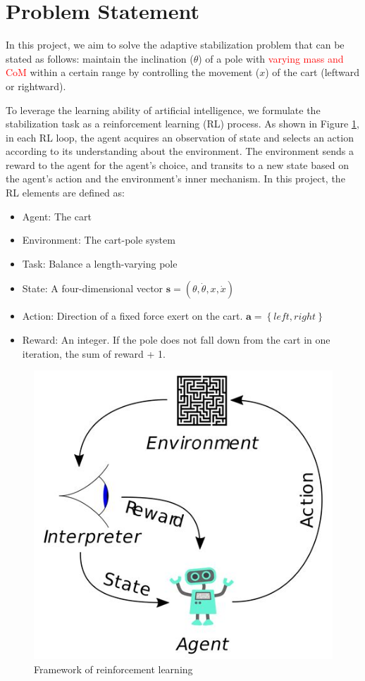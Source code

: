 \documentclass[10pt,a4paper]{article}
\begin{document}
\section{Problem Statement}
In this project, we aim to solve the adaptive stabilization problem that can be stated as follows: maintain the inclination ($\theta$) of a pole with \textcolor{red}{varying mass and CoM} within a certain range by controlling the movement ($x$) of the cart (leftward or rightward).

To leverage the learning ability of artificial intelligence, we formulate the stabilization task as a reinforcement learning (RL) process. As shown in Figure \ref{fig:rl}, in each RL loop, the agent acquires an observation of state and selects an action according to its understanding about the environment. The environment sends a reward to  the agent for the agent's choice, and transits to a new state based on the agent's action and the environment's inner mechanism. In this project, the RL elements are defined as:

\begin{itemize}
	\item Agent: The cart
	\item Environment: The cart-pole system
	\item Task: Balance a length-varying pole
	\item State: A four-dimensional vector $\boldsymbol{s} = (\theta, \dot{\theta}, x, \dot{x})$
	\item Action: Direction of a fixed force exert on the cart. $\boldsymbol{a} = \left\{ left, right\right\}$
	\item Reward: An integer. If the pole does not fall down from the cart in one iteration, the sum of reward + 1. 
\end{itemize}



 
\begin{figure}
\centering
\includegraphics[width=0.3\linewidth]{figure/rl}
\caption{Framework of reinforcement learning}
\label{fig:rl}
\end{figure}
\end{document}
